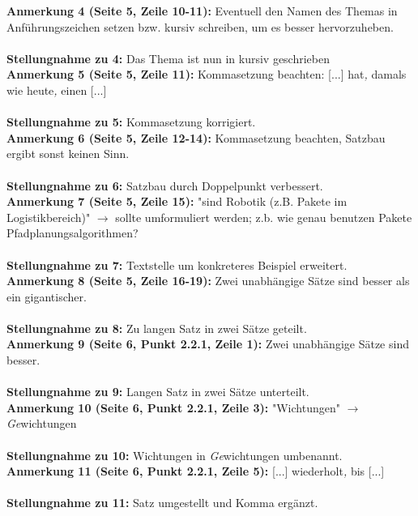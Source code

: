 \documentclass[a4paper,12pt]{book}
\begin{document}
\noindent
\textbf{Anmerkung 4 (Seite 5, Zeile 10-11):}
Eventuell den Namen des Themas in Anführungszeichen setzen bzw. kursiv schreiben, um es besser hervorzuheben.\\
\\
\textbf{Stellungnahme zu 4:}
Das Thema ist nun in kursiv geschrieben
\\

\noindent
\textbf{Anmerkung 5 (Seite 5, Zeile 11):}
Kommasetzung beachten: [...] hat\emph{,} damals wie heute\emph{,} einen [...] \\
\\
\textbf{Stellungnahme zu 5:}
Kommasetzung korrigiert.\\

\noindent
\textbf{Anmerkung 6 (Seite 5, Zeile 12-14):}
Kommasetzung beachten, Satzbau ergibt sonst keinen Sinn. \\
\\
\textbf{Stellungnahme zu 6:}
Satzbau durch Doppelpunkt verbessert.
\\

\noindent
\textbf{Anmerkung 7 (Seite 5, Zeile 15):}
"sind Robotik (z.B. Pakete im Logistikbereich)" $\rightarrow$ sollte umformuliert werden; z.b. wie genau benutzen Pakete Pfadplanungsalgorithmen? \\
\\
\textbf{Stellungnahme zu 7:}
Textstelle um konkreteres Beispiel erweitert.
\\

\noindent
\textbf{Anmerkung 8 (Seite 5, Zeile 16-19):}
Zwei unabhängige Sätze sind besser als ein gigantischer. \\
\\
\textbf{Stellungnahme zu 8:}
Zu langen Satz in zwei Sätze geteilt.
\\

\noindent
\textbf{Anmerkung 9 (Seite 6, Punkt 2.2.1, Zeile 1):}
Zwei unabhängige Sätze sind besser. \\
\\
\textbf{Stellungnahme zu 9:}
Langen Satz in zwei Sätze unterteilt.
\\

\noindent
\textbf{Anmerkung 10 (Seite 6, Punkt 2.2.1, Zeile 3):}
"Wichtungen" $\rightarrow$ \emph{Ge}wichtungen \\
\\
\textbf{Stellungnahme zu 10:}
Wichtungen in \emph{Ge}wichtungen umbenannt.
\\

\noindent
\textbf{Anmerkung 11 (Seite 6, Punkt 2.2.1, Zeile 5):}
[...] wiederholt\emph{,} bis [...] \\
\\
\textbf{Stellungnahme zu 11:}
Satz umgestellt und Komma ergänzt.
\\
\end{document}
